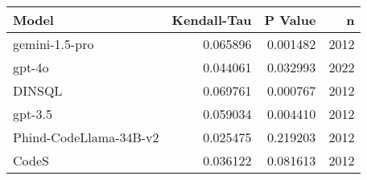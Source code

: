 \begin{tabular}{lrrr}
\toprule
Model & Kendall-Tau & P Value & n \\
\midrule
gemini-1.5-pro & 0.065896 & 0.001482 & 2012 \\
gpt-4o & 0.044061 & 0.032993 & 2022 \\
DINSQL & 0.069761 & 0.000767 & 2012 \\
gpt-3.5 & 0.059034 & 0.004410 & 2012 \\
Phind-CodeLlama-34B-v2 & 0.025475 & 0.219203 & 2012 \\
CodeS & 0.036122 & 0.081613 & 2012 \\
\bottomrule
\end{tabular}
